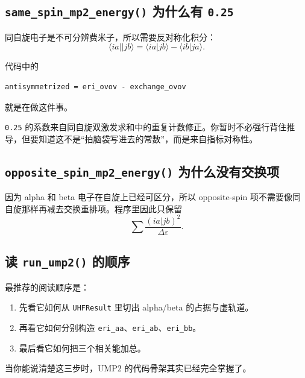 \documentclass[UTF8,11pt,fontset=fandol]{ctexbook}
\begin{document}
\subsection*{\texttt{same\_spin\_mp2\_energy()} 为什么有 \texttt{0.25}}

同自旋电子是不可分辨费米子，所以需要反对称化积分：
\begin{equation}
\langle ia||jb\rangle = \langle ia|jb\rangle - \langle ib|ja\rangle.
\end{equation}

代码中的
\begin{lstlisting}[style=pythonstyle]
antisymmetrized = eri_ovov - exchange_ovov
\end{lstlisting}
就是在做这件事。

\texttt{0.25} 的系数来自同自旋双激发求和中的重复计数修正。你暂时不必强行背住推导，但要知道这不是“拍脑袋写进去的常数”，而是来自指标对称性。

\subsection*{\texttt{opposite\_spin\_mp2\_energy()} 为什么没有交换项}

因为 alpha 和 beta 电子在自旋上已经可区分，所以 opposite-spin 项不需要像同自旋那样再减去交换重排项。程序里因此只保留
\begin{equation}
\sum \frac{(ia|jb)^2}{\Delta \varepsilon}.
\end{equation}

\subsection*{读 \texttt{run\_ump2()} 的顺序}

最推荐的阅读顺序是：
\begin{enumerate}[label=\arabic*.]
  \item 先看它如何从 \texttt{UHFResult} 里切出 alpha/beta 的占据与虚轨道。
  \item 再看它如何分别构造 \texttt{eri\_aa}、\texttt{eri\_ab}、\texttt{eri\_bb}。
  \item 最后看它如何把三个相关能加总。
\end{enumerate}

当你能说清楚这三步时，UMP2 的代码骨架其实已经完全掌握了。
\end{document}
